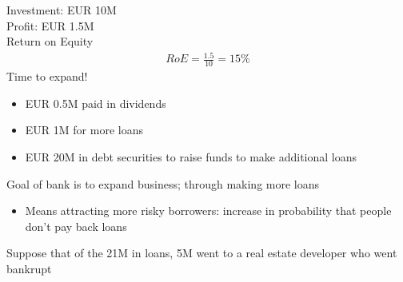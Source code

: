 \documentclass{beamer}
\begin{document}
\begin{frame}
 Investment: EUR 10M\\
 Profit: EUR 1.5M\\
 Return on Equity
 \begin{align}
   RoE=\frac{1.5}{10}=15\%
 \end{align}
 \medskip
 Time to expand! 
\begin{itemize}
  \item EUR 0.5M paid in dividends
  \item EUR 1M for more loans
  \item EUR 20M in debt securities to raise funds to make additional loans
\end{itemize}
\end{frame}
\begin{frame}
\begin{table}[!h] \centering
\caption{Balance sheet after expanding the business}
\end{table}
\end{frame}

\begin{frame}
  Goal of bank is to expand business; through making more loans
  \begin{itemize}
    \item Means attracting more risky borrowers: increase in probability that people don't pay back loans
  \end{itemize}
  \medskip
  Suppose that of the 21M in loans, 5M went to a real estate developer who went bankrupt
\end{frame}
\end{document}
